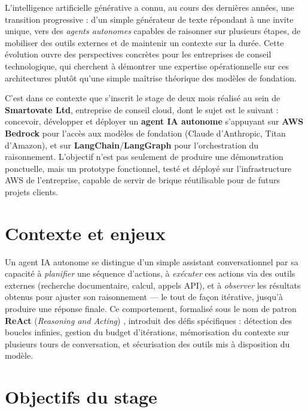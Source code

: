 \documentclass[11pt,a4paper]{report}
\begin{document}
L'intelligence artificielle générative a connu, au cours des dernières
années, une transition progressive : d'un simple générateur de texte
répondant à une invite unique, vers des \textit{agents autonomes}
capables de raisonner sur plusieurs étapes, de mobiliser des outils
externes et de maintenir un contexte sur la durée. Cette évolution
ouvre des perspectives concrètes pour les entreprises de conseil
technologique, qui cherchent à démontrer une expertise opérationnelle
sur ces architectures plutôt qu'une simple maîtrise théorique des
modèles de fondation.

C'est dans ce contexte que s'inscrit le stage de deux mois réalisé au
sein de \textbf{Smartovate Ltd}, entreprise de conseil cloud, dont le
sujet est le suivant : concevoir, développer et déployer un
\textbf{agent IA autonome} s'appuyant sur \textbf{AWS Bedrock} pour
l'accès aux modèles de fondation (Claude d'Anthropic, Titan d'Amazon),
et sur \textbf{LangChain}/\textbf{LangGraph} pour l'orchestration du
raisonnement. L'objectif n'est pas seulement de produire une
démonstration ponctuelle, mais un prototype fonctionnel, testé et
déployé sur l'infrastructure AWS de l'entreprise, capable de servir de
brique réutilisable pour de futurs projets clients.

\section{Contexte et enjeux}

Un agent IA autonome se distingue d'un simple assistant conversationnel
par sa capacité à \textit{planifier} une séquence d'actions, à
\textit{exécuter} ces actions via des outils externes (recherche
documentaire, calcul, appels API), et à \textit{observer} les
résultats obtenus pour ajuster son raisonnement — le tout de façon
itérative, jusqu'à produire une réponse finale. Ce comportement, formalisé
sous le nom de patron \textbf{ReAct} (\textit{Reasoning and Acting})
\cite{yao2022react}, introduit des défis spécifiques : détection des
boucles infinies, gestion du budget d'itérations, mémorisation du
contexte sur plusieurs tours de conversation, et sécurisation des
outils mis à disposition du modèle.

\section{Objectifs du stage}
\end{document}
